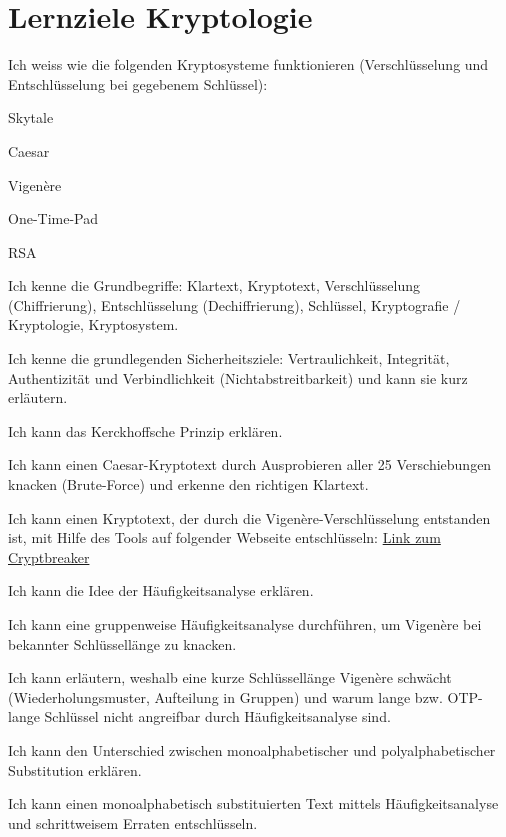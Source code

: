 \chapter{Lernziele Kryptologie}

\begin{todolist}
  \item Ich weiss wie die folgenden Kryptosysteme funktionieren (Verschlüsselung und Entschlüsselung bei gegebenem Schlüssel):
  \begin{todolist}
    \item Skytale
    \item Caesar
    \item Vigenère
    \item One-Time-Pad
    \item RSA
  \end{todolist}
  \item Ich kenne die Grundbegriffe: Klartext, Kryptotext, Verschlüsselung (Chiffrierung), Entschlüsselung (Dechiffrierung), Schlüssel, Kryptografie / Kryptologie, Kryptosystem.
  \item Ich kenne die grundlegenden Sicherheitsziele: Vertraulichkeit, Integrität, Authentizität und Verbindlichkeit (Nichtabstreitbarkeit) und kann sie kurz erläutern.
  \item Ich kann das Kerckhoffsche Prinzip erklären.
  \item Ich kann einen Caesar-Kryptotext durch Ausprobieren aller 25 Verschiebungen knacken (Brute-Force) und erkenne den richtigen Klartext.
  \item Ich kann einen Kryptotext, der durch die Vigenère-Verschlüsselung entstanden ist, mit Hilfe des Tools auf folgender Webseite entschlüsseln: \href{https://cryptbreaker.marcwidmer.xyz}{Link zum Cryptbreaker}
  \item Ich kann die Idee der Häufigkeitsanalyse erklären.
  \item Ich kann eine gruppenweise Häufigkeitsanalyse durchführen, um Vigenère bei bekannter Schlüssellänge zu knacken.
  \item Ich kann erläutern, weshalb eine kurze Schlüssellänge Vigenère schwächt (Wiederholungsmuster, Aufteilung in Gruppen) und warum lange bzw. OTP-lange Schlüssel nicht angreifbar durch Häufigkeitsanalyse sind.
  \item Ich kann den Unterschied zwischen monoalphabetischer und polyalphabetischer Substitution erklären.
  \item Ich kann einen monoalphabetisch substituierten Text mittels Häufigkeitsanalyse und schrittweisem Erraten entschlüsseln.

\end{todolist}
